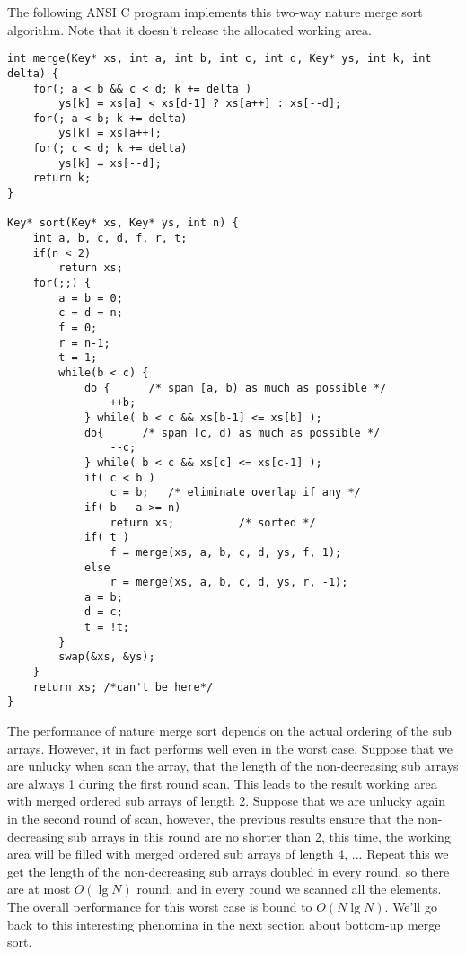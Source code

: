 \documentclass{article}
\begin{document}
The following ANSI C program implements this two-way nature merge sort algorithm. Note that it
doesn't release the allocated working area.

\lstset{language=C}
\begin{lstlisting}
int merge(Key* xs, int a, int b, int c, int d, Key* ys, int k, int delta) {
    for(; a < b && c < d; k += delta )
        ys[k] = xs[a] < xs[d-1] ? xs[a++] : xs[--d];
    for(; a < b; k += delta)
        ys[k] = xs[a++];
    for(; c < d; k += delta)
        ys[k] = xs[--d];
    return k;
}

Key* sort(Key* xs, Key* ys, int n) {
    int a, b, c, d, f, r, t;
    if(n < 2)
        return xs;
    for(;;) {
        a = b = 0;
        c = d = n;
        f = 0;
        r = n-1;
        t = 1;
        while(b < c) {
            do {      /* span [a, b) as much as possible */
                ++b;
            } while( b < c && xs[b-1] <= xs[b] );
            do{      /* span [c, d) as much as possible */
                --c;
            } while( b < c && xs[c] <= xs[c-1] );
            if( c < b )
                c = b;   /* eliminate overlap if any */
            if( b - a >= n) 
                return xs;          /* sorted */
            if( t )
                f = merge(xs, a, b, c, d, ys, f, 1);
            else
                r = merge(xs, a, b, c, d, ys, r, -1);
            a = b;
            d = c;
            t = !t;
        } 
        swap(&xs, &ys);
    }
    return xs; /*can't be here*/
}
\end{lstlisting}

The performance of nature merge sort depends on the actual ordering of the sub arrays. However, it in fact performs
well even in the worst case. Suppose that we are unlucky when scan the array, that the length of the non-decreasing
sub arrays are always 1 during the first round scan. This leads to the result working area with merged ordered sub
arrays of length 2. Suppose that we are unlucky again in the second round of scan, however, the previous results
ensure that the non-decreasing sub arrays in this round are no shorter than 2, this time, the working area will
be filled with merged ordered sub arrays of length 4, ... Repeat this we get the length of the non-decreasing sub arrays
doubled in every round, so there are at most $O(\lg N)$ round, and in every round we scanned all the elements.
The overall performance for this worst case is bound to $O(N \lg N)$. We'll go back to this interesting phenomina
in the next section about bottom-up merge sort.
\end{document}
